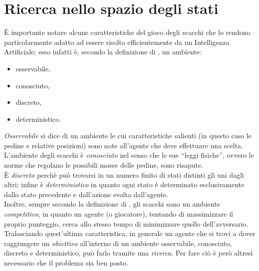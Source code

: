 \section{Ricerca nello spazio degli stati}


È importante notare alcune caratteristiche del gioco degli scacchi che lo rendono particolarmente adatto ad essere risolto efficientemente da un Intelligenza Artificiale; esso infatti è, secondo la definizione di \cite{randw}, un ambiente:
\begin{itemize}
   \item osservabile,
   \item conosciuto,
   \item discreto,
   \item deterministico.
\end{itemize}
\emph{Osservabile} si dice di un ambiente le cui caratteristiche salienti (in questo caso le pedine e relative posizioni) sono note all'agente che deve effettuare una scelta.
L'ambiente degli scacchi è \emph{conosciuto} nel senso che le sue ``leggi fisiche'', ovvero le norme che regolano le possibili mosse delle pedine, sono risapute.\\
È \emph{discreto} perchè può trovarsi in un numero finito di stati distinti gli uni dagli altri; infine è \emph{deterministico} in quanto ogni stato è determinato esclusivamente dallo stato precedente e dall'azione svolta dall'agente.\\
Inoltre, sempre secondo la definizione di \cite{randw}, gli scacchi sono un ambiente \emph{competitivo}, in quanto un agente (o giocatore), tentando di massimizzare il proprio punteggio, cerca allo stesso tempo di minimizzare quello dell'avversario.\\
Tralasciando quest'ultima caratteristica, in generale un agente che si trovi a dover raggiungere un \emph{obiettivo} all'interno di un ambiente osservabile, conosciuto, discreto e deterministico, può farlo tramite una \emph{ricerca}.
Per fare ciò è però altresì necessario che il problema sia ben posto.

